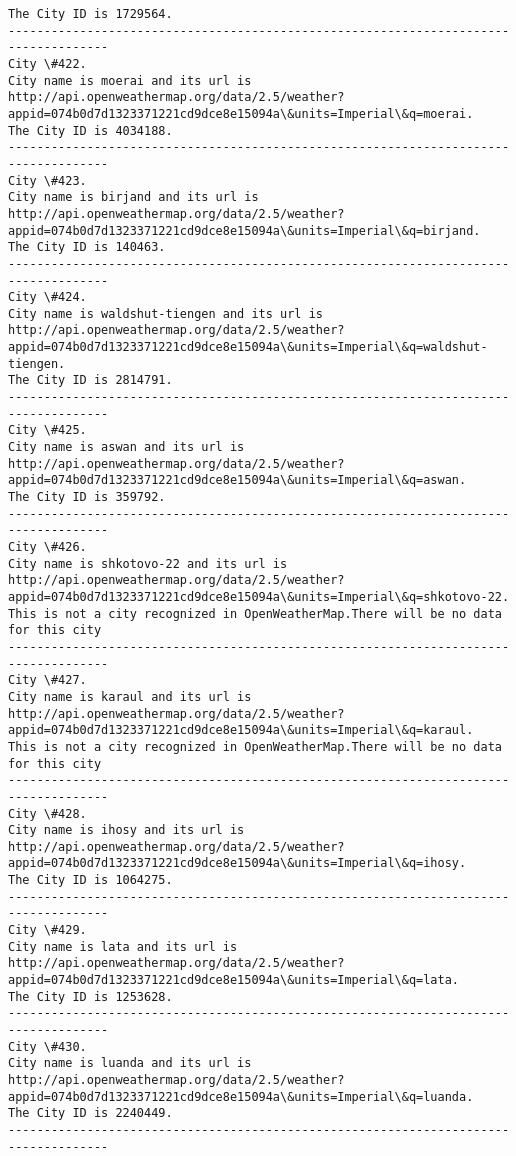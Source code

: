 \documentclass[11pt]{article}
\begin{document}
\begin{Verbatim}[commandchars=\\\{\}]
The City ID is 1729564.
------------------------------------------------------------------------------------
City \#422.
City name is moerai and its url is http://api.openweathermap.org/data/2.5/weather?appid=074b0d7d1323371221cd9dce8e15094a\&units=Imperial\&q=moerai.
The City ID is 4034188.
------------------------------------------------------------------------------------
City \#423.
City name is birjand and its url is http://api.openweathermap.org/data/2.5/weather?appid=074b0d7d1323371221cd9dce8e15094a\&units=Imperial\&q=birjand.
The City ID is 140463.
------------------------------------------------------------------------------------
City \#424.
City name is waldshut-tiengen and its url is http://api.openweathermap.org/data/2.5/weather?appid=074b0d7d1323371221cd9dce8e15094a\&units=Imperial\&q=waldshut-tiengen.
The City ID is 2814791.
------------------------------------------------------------------------------------
City \#425.
City name is aswan and its url is http://api.openweathermap.org/data/2.5/weather?appid=074b0d7d1323371221cd9dce8e15094a\&units=Imperial\&q=aswan.
The City ID is 359792.
------------------------------------------------------------------------------------
City \#426.
City name is shkotovo-22 and its url is http://api.openweathermap.org/data/2.5/weather?appid=074b0d7d1323371221cd9dce8e15094a\&units=Imperial\&q=shkotovo-22.
This is not a city recognized in OpenWeatherMap.There will be no data for this city
------------------------------------------------------------------------------------
City \#427.
City name is karaul and its url is http://api.openweathermap.org/data/2.5/weather?appid=074b0d7d1323371221cd9dce8e15094a\&units=Imperial\&q=karaul.
This is not a city recognized in OpenWeatherMap.There will be no data for this city
------------------------------------------------------------------------------------
City \#428.
City name is ihosy and its url is http://api.openweathermap.org/data/2.5/weather?appid=074b0d7d1323371221cd9dce8e15094a\&units=Imperial\&q=ihosy.
The City ID is 1064275.
------------------------------------------------------------------------------------
City \#429.
City name is lata and its url is http://api.openweathermap.org/data/2.5/weather?appid=074b0d7d1323371221cd9dce8e15094a\&units=Imperial\&q=lata.
The City ID is 1253628.
------------------------------------------------------------------------------------
City \#430.
City name is luanda and its url is http://api.openweathermap.org/data/2.5/weather?appid=074b0d7d1323371221cd9dce8e15094a\&units=Imperial\&q=luanda.
The City ID is 2240449.
------------------------------------------------------------------------------------

\end{Verbatim}
\end{document}
